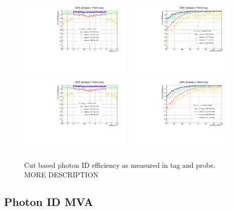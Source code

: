 \begin{figure}
  \includegraphics[width=0.48\textwidth]{selec_and_cats/plots/eff_7TeV_eta.pdf}
  \includegraphics[width=0.48\textwidth]{selec_and_cats/plots/eff_7TeV_pt.pdf}
  \includegraphics[width=0.48\textwidth]{selec_and_cats/plots/eff_7TeV_eta.pdf}
  \includegraphics[width=0.48\textwidth]{selec_and_cats/plots/eff_8TeV_pt.pdf}
  \caption{Cut based photon ID efficiency as measured in \Zee tag and probe. MORE DESCRIPTION}
  \label{fig:cic_efficiency}
\end{figure}

\subsection{Photon ID MVA}
\label{sec:pho_id_mva}

